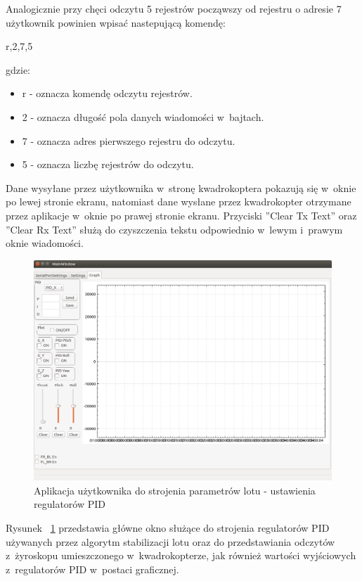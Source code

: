 Analogicznie przy chęci odczytu 5 rejestrów począwszy od rejestru o adresie 7 użytkownik powinien wpisać nastepującą komendę:

r,2,7,5

gdzie:
\begin{itemize}
	\item r - oznacza komendę odczytu rejestrów.
	\item 2 - oznacza długość pola danych wiadomości w~bajtach.
	\item 7 - oznacza adres pierwszego rejestru do odczytu.
	\item 5 - oznacza liczbę rejestrów do odczytu.
\end{itemize}
Dane wysyłane przez użytkownika w~stronę kwadrokoptera pokazują się w~oknie po lewej stronie ekranu, natomiast dane wysłane przez kwadrokopter  otrzymane przez aplikacje w~oknie po prawej stronie ekranu. Przyciski ''Clear Tx Text'' oraz ''Clear Rx Text'' służą do czyszczenia tekstu odpowiednio w~lewym i~prawym oknie wiadomości. 

\begin{figure}[H]
	\centering
	\includegraphics[scale=0.4]{Pictures/QuadroTune/QuadroTuneGraph.png}
	\caption[Aplikacja użytkownika do strojenia parametrów lotu - ustawienia regulatorów PID]{Aplikacja użytkownika do strojenia parametrów lotu - ustawienia regulatorów PID}
	\label{fig:QuadroTune_screen3}
\end{figure}

Rysunek ~\ref{fig:QuadroTune_screen3} przedstawia główne okno służące do strojenia regulatorów PID używanych przez algorytm stabilizacji lotu oraz do przedstawiania odczytów z~żyroskopu umieszczonego w~kwadrokopterze, jak również wartości wyjściowych z~regulatorów PID w~postaci graficznej.

